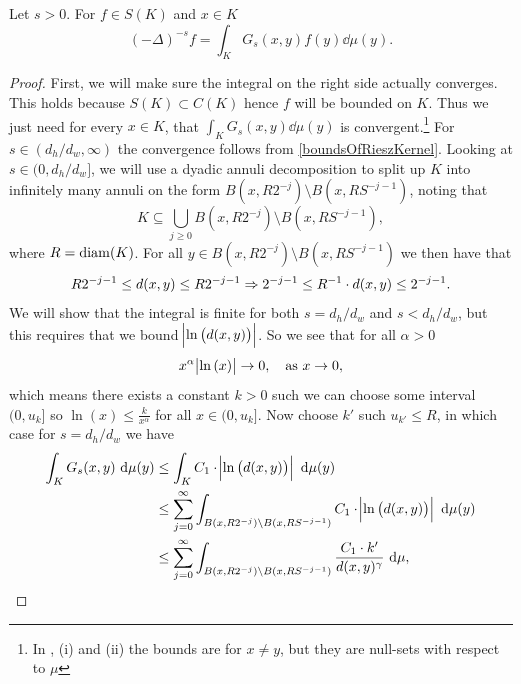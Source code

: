 \medskip
\begin{lemma}\label{fractionalLaplacianIsRieszKernel}
	Let $s > 0$. For $f \in S(K)$ and $x \in K$
	\begin{equation}
		(-\Delta)^{-s}f = \int_{K}G_s(x,y)f(y) \dd \mu(y).
	\end{equation}
\end{lemma}
\begin{proof}
	First, we will make sure the integral on the right side actually converges. This holds because $S(K) \subset C(K)$ hence $f$ will be bounded on $K$. Thus we just need for every $x \in K$, that $\int_{K}G_s(x,y) \dd \mu(y)$ is convergent.\footnote{In , (i) and (ii) the bounds are for $x \neq y$, but they are null-sets with respect to $\mu$}  For $s \in (d_h/d_w, \infty)$ the convergence follows from \cref{boundsOfRieszKernel}. Looking at $s \in (0, d_h/d_w]$, we will use a dyadic annuli decomposition to split up $K$ into infinitely many annuli on the form $ B(x, R2^{-j})\setminus B(x,RS^{-j-1})$, noting that
	\begin{equation}
		K \subseteq \bigcup_{j \geq 0} B(x, R2^{-j})\setminus B(x,RS^{-j-1}),
	\end{equation}
	where $R = \operatorname{diam}(K)$. For all $y \in B(x, R2^{-j})\setminus B(x,RS^{-j-1})$ we then have that
	\begin{equation}
		R2^{-j-1} \leq d(x,y) \leq R2^{-j-1} \Rightarrow 2^{-j-1} \leq R^{-1} \cdot d(x,y) \leq 2^{-j-1} .
	\end{equation}
	  We will show that the integral is finite for both $s = d_h/d_w$ and $s<d_h/d_w$, but this requires that we bound $\abs{\ln \left(d(x,y) \right)}$. So we see that for all $\alpha > 0$
	\begin{equation}
		x^{\alpha} \abs{\ln \left(x\right)} \to 0, \quad \text{as } x \to 0,
	\end{equation}
	which means there exists a constant $k > 0$ such we can choose some interval $(0, u_k]$ so 
	$\ln(x) \leq \frac{k}{x^{\alpha}}$ for all $x \in (0, u_k]$. \clearpage \noi Now choose $k'$ such $u_{k'} \leq R$, in which case for $s = d_h/d_w$ we have
	\begin{align}
		\int_{K} G_s(x,y) \dd \mu(y) &\leq \int_{K} C_1 \cd \abs{\ln\left( d(x,y)\right)} \dd \mu(y)\\
		& \leq  \sum_{j = 0}^{\infty} \int_{B(x, R2^{-j})\setminus B(x,RS^{-j-1})} C_1\cd \abs{\ln \left(d(x,y)\right)} \dd \mu(y) \\
		&\leq \sum_{j = 0}^{\infty} \int_{B(x, R2^{-j})\setminus B(x,RS^{-j-1})} \frac{C_1 \cd k'}{d(x,y)^{\gamma}} \dd \mu,

\end{align}
\end{proof}
